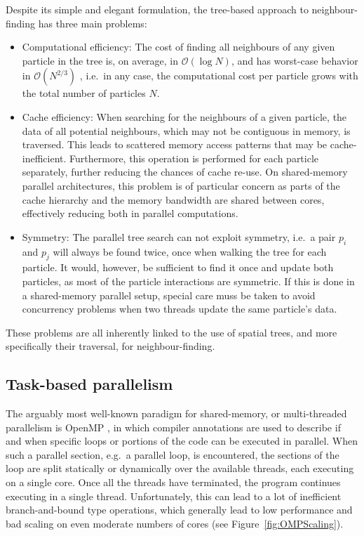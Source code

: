 \documentclass[final]{siamltex}
\newcommand{\oh}[1]
    {\mbox{$ {\mathcal O}( #1 ) $}}
\newcommand{\fig}[1]
    {Figure~\ref{fig:#1}}
\begin{document}
Despite its simple and elegant formulation, the tree-based
approach to neighbour-finding has three main problems:
\begin{itemize}
    \item Computational efficiency: The cost of finding all neighbours
        of any given particle in the tree is, on average, in \oh{\log N},
        and has worst-case behavior in \oh{N^{2/3}} \cite{ref:Lee1977},
        i.e.~in any case, the computational cost per particle grows with the
        total number of particles $N$.
    \item Cache efficiency: When searching for the neighbours of a
        given particle, the data of all potential neighbours, which may
        not be contiguous in memory, is traversed.
        This leads to scattered memory access patterns that may be
        cache-inefficient. Furthermore, this operation is performed for
        each particle separately, further reducing the chances
        of cache re-use.
        On shared-memory parallel architectures, this problem is of
        particular concern as parts of the cache hierarchy and the
        memory bandwidth are shared between cores, effectively
        reducing both in parallel computations.
    \item Symmetry: The parallel tree search can not exploit symmetry,
        i.e.~a pair $p_i$ and $p_j$ will always be found twice,
        once when walking the tree for each particle. It would, however,
        be sufficient to find it once and update both particles, as most
        of the particle interactions are symmetric.
        If this is done in a shared-memory parallel setup, special
        care muss be taken to avoid concurrency problems when
        two threads update the same particle's data.
\end{itemize}
    
These problems are all inherently linked to the use of
spatial trees, and more specifically their traversal,
for neighbour-finding.


\subsection{Task-based parallelism}

The arguably most well-known paradigm for shared-memory,
or multi-threaded parallelism is OpenMP \cite{ref:Dagum1998},
in which compiler annotations are used to describe if and when
specific loops or portions of the code can be executed
in parallel.
When such a parallel section, e.g.~a parallel loop, is
encountered, the sections of the loop are split statically
or dynamically over the available threads, each executing
on a single core.
Once all the threads have terminated, the program continues
executing in a single thread.
Unfortunately, this can lead to a lot of inefficient
branch-and-bound
type operations, which generally lead to low performance and
bad scaling on even moderate numbers of cores (see \fig{OMPScaling}).
\end{document}
